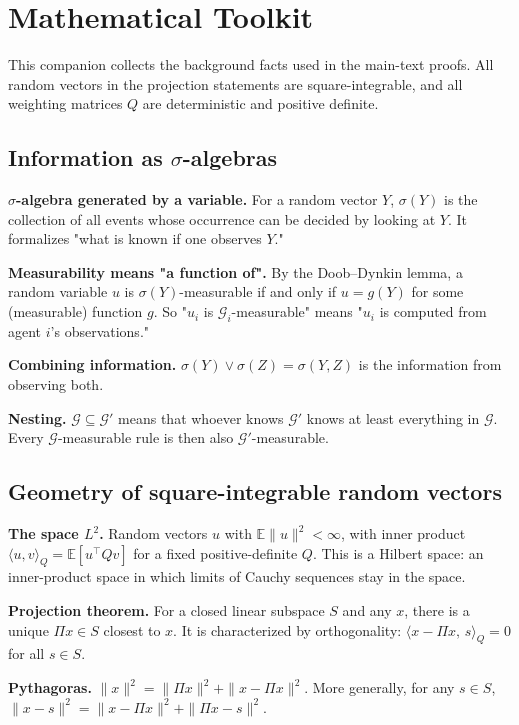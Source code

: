 \section{Mathematical Toolkit}
\label{app:toolkit}
This companion collects the background facts used in the main-text proofs.
All random vectors in the projection statements are square-integrable, and
all weighting matrices $Q$ are deterministic and positive definite.

\subsection{Information as \texorpdfstring{$\sigma$}{sigma}-algebras}
\label{app:toolkit-1}
\textbf{$\sigma$-algebra generated by a variable.} For a random vector $Y$, $\sigma(Y)$ is the collection of all events whose occurrence can be decided by looking at $Y$. It formalizes "what is known if one observes $Y$."

\textbf{Measurability means "a function of".} By the Doob--Dynkin lemma, a random variable $u$ is $\sigma(Y)$-measurable if and only if $u=g(Y)$ for some (measurable) function $g$. So "$u_i$ is $\mathcal G_i$-measurable" means "$u_i$ is computed from agent $i$'s observations."

\textbf{Combining information.} $\sigma(Y)\vee\sigma(Z)=\sigma(Y,Z)$ is the information from observing both.

\textbf{Nesting.} $\mathcal G\subseteq\mathcal G'$ means that whoever knows $\mathcal G'$ knows at least everything in $\mathcal G$. Every $\mathcal G$-measurable rule is then also $\mathcal G'$-measurable.

\subsection{Geometry of square-integrable random vectors}
\label{app:toolkit-2}
\textbf{The space $L^2$.} Random vectors $u$ with $\mathbb E\|u\|^2<\infty$, with inner product $\langle u,v\rangle_Q=\mathbb E[u^\top Qv]$ for a fixed positive-definite $Q$. This is a Hilbert space: an inner-product space in which limits of Cauchy sequences stay in the space.

\textbf{Projection theorem.} For a closed linear subspace $S$ and any $x$, there is a unique $\Pi x\in S$ closest to $x$. It is characterized by orthogonality: $\langle x-\Pi x,\,s\rangle_Q=0$ for all $s\in S$.

\textbf{Pythagoras.} $\|x\|^2=\|\Pi x\|^2+\|x-\Pi x\|^2$. More generally, for any $s\in S$, $\|x-s\|^2=\|x-\Pi x\|^2+\|\Pi x-s\|^2$.

